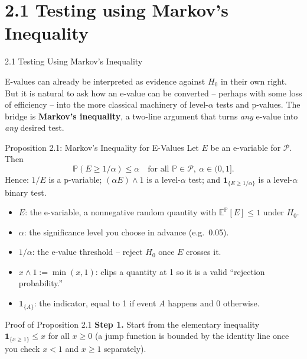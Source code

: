 \documentclass[aspectratio=169,10pt]{beamer}
\newcommand{\PP}{\mathbb{P}}
\newcommand{\EE}{\mathbb{E}}
\newcommand{\calP}{\mathcal{P}}
\newcommand{\ind}[1]{\mathbf{1}_{\{#1\}}}
\begin{document}
\section{2.1 Testing using Markov's Inequality}

\begin{frame}[allowframebreaks]{2.1 Testing Using Markov's Inequality}

E-values can already be interpreted as evidence against $H_0$ in their own
right. But it is natural to ask how an e-value can be converted -- perhaps
with some loss of efficiency -- into the more classical machinery of
level-$\alpha$ tests and p-values. The bridge is \textbf{Markov's inequality},
a two-line argument that turns \emph{any} e-value into \emph{any} desired test.

  \begin{block}{Proposition 2.1: Markov's Inequality for E-Values}
    Let $E$ be an e-variable for $\calP$. Then
    \[
      \PP(E \ge 1/\alpha) \le \alpha \quad \text{for all } \PP \in \calP,\ \alpha \in (0,1].
    \]
    Hence: $1/E$ is a p-variable; $(\alpha E) \wedge 1$ is a level-$\alpha$
    test; and $\ind{E \ge 1/\alpha}$ is a level-$\alpha$ binary test.
  \end{block}

  \begin{itemize}
    \item $E$: the e-variable, a nonnegative random quantity with
      $\EE^\PP[E]\le 1$ under $H_0$.
    \item $\alpha$: the significance level you choose in advance (e.g.\ 0.05).
    \item $1/\alpha$: the e-value threshold -- reject $H_0$ once $E$ crosses it.
    \item $x \wedge 1 := \min(x,1)$: clips a quantity at 1 so it is a valid
      ``rejection probability.''
    \item $\ind{A}$: the indicator, equal to 1 if event $A$ happens and 0 otherwise.
  \end{itemize}

  \framebreak

  \begin{block}{Proof of Proposition 2.1}
    \textbf{Step 1.} Start from the elementary inequality
    $\ind{x \ge 1} \le x$ for all $x \ge 0$ (a jump function is bounded by
    the identity line once you check $x<1$ and $x\ge1$ separately).


\end{block}
\end{frame}
\end{document}
